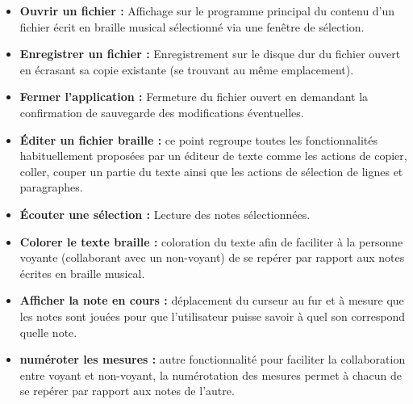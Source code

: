 \begin{itemize}
  \item[\textbullet] \textbf{Ouvrir un fichier :} Affichage sur le programme principal du contenu d'un fichier écrit en braille musical sélectionné via une fenêtre de sélection.\\
  \item[\textbullet] \textbf{Enregistrer un fichier :} Enregistrement sur le disque dur du fichier ouvert en écrasant sa copie existante (se trouvant au même emplacement).\\  
  \item[\textbullet] \textbf{Fermer l'application :} Fermeture du fichier ouvert en demandant la confirmation de sauvegarde des modifications éventuelles.\\
  \item[\textbullet] \textbf{Éditer un fichier braille :} ce point regroupe toutes les fonctionnalités habituellement proposées par un éditeur de texte comme les actions de copier, coller, couper un partie du texte ainsi que les actions de sélection de lignes et paragraphes.\\  
  \item[\textbullet] \textbf{Écouter une sélection :} Lecture des notes sélectionnées.\\
  \item[\textbullet] \textbf{Colorer le texte braille :} coloration du texte afin de faciliter à la personne voyante (collaborant avec un non-voyant) de se repérer par rapport aux notes écrites en braille musical.\\
  \item[\textbullet] \textbf{Afficher la note en cours :} déplacement du curseur au fur et à mesure que les notes sont jouées pour que l'utilisateur puisse savoir à quel son correspond quelle note.\\
  \item[\textbullet] \textbf{numéroter les mesures :} autre fonctionnalité pour faciliter la collaboration entre voyant et non-voyant, la numérotation des mesures permet à chacun de se repérer par rapport aux notes de l'autre.\\
\end{itemize}

